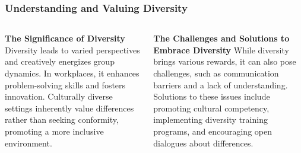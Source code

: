 \documentclass[5pt]{beamer}
\begin{document}
\begin{frame}
\frametitle{Understanding and Valuing Diversity}
\begin{columns}
\begin{column}{0.45\textwidth}
\begin{block}{\textbf{The Significance of Diversity}}
Diversity leads to varied perspectives and creatively energizes group dynamics. In workplaces, it enhances problem-solving skills and fosters innovation. Culturally diverse settings inherently value differences rather than seeking conformity, promoting a more inclusive environment.
\end{block}
\end{column}
\begin{column}{0.45\textwidth}
\begin{block}{\textbf{The Challenges and Solutions to Embrace Diversity}}
While diversity brings various rewards, it can also pose challenges, such as communication barriers and a lack of understanding. Solutions to these issues include promoting cultural competency, implementing diversity training programs, and encouraging open dialogues about differences.
\end{block}
\end{column}
\end{columns}
\end{frame}
\end{document}
